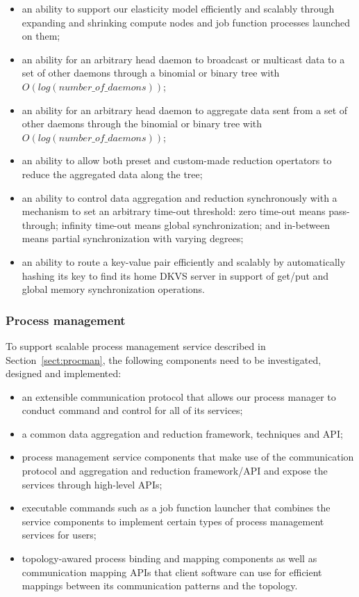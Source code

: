 \begin{itemize}

\item{an ability to support our elasticity model
efficiently and scalably through expanding and shrinking
compute nodes and job function processes launched on them;}

\item{an ability for an arbitrary head daemon to broadcast
or multicast data to a set of other daemons through a binomial
or binary tree with $O(log(number\_of\_daemons))$;}

\item{an ability for an arbitrary head daemon to aggregate data
sent from a set of other daemons through the binomial
or binary tree with $O(log(number\_of\_daemons))$;}

\item{an ability to allow both preset and custom-made reduction
opertators to reduce the aggregated data along the tree;}

\item{an ability to control data aggregation and reduction synchronously
with a mechanism to set an arbitrary time-out threshold: zero time-out means pass-through;
infinity time-out means global synchronization; and
in-between means partial synchronization with varying degrees;}

\item{an ability to route a key-value pair efficiently and
scalably by automatically hashing its key to find its home DKVS server
in support of get/put and global memory synchronization operations.}

\end{itemize}

\subsubsection{Process management}
To support scalable process management service described in Section~\ref{sect:procman},
the following components need to be investigated, designed and implemented:
\begin{itemize}
\item{an extensible communication protocol that allows
our process manager to conduct command and control
for all of its services;}
\item{a common data aggregation and reduction framework, techniques and API;}
\item{process management service components that
make use of the communication protocol and aggregation and reduction framework/API
and expose the services through high-level APIs;}
\item{executable commands such as a job function launcher that combines the
service components to implement certain types of process management
services for users;}
\item{topology-awared process binding and mapping components as well as
communication mapping APIs that client software can use for efficient
mappings between its communication patterns and the topology.}
\end{itemize}

